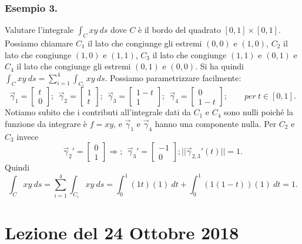 \documentclass[10pt]{article}
\theoremstyle{plain}
\theoremstyle{definition}
\begin{document}
\subsubsection{Esempio 3.}
Valutare l'integrale $\int_Cxy\ ds$ dove $C$ è il bordo del quadrato $[0,1]\times [0,1]$. Possiamo chiamare $C_1$ il lato che congiunge gli estremi $(0,0)$ e $(1,0)$, $C_2$ il lato che congiunge $(1,0)$ e $(1,1)$, $C_3$ il lato che congiunge $(1,1)$ e $(0,1)$ e $C_4$ il lato che congiunge gli estremi $(0,1)$ e $(0,0)$. Si ha quindi $\int_Cxy\ ds=\sum_{i=1}^4\int_{C_i}xy\ ds$.
Possiamo parametrizzare facilmente:
$$ \vec{\gamma}_1=\begin{bmatrix}t\\0 \end{bmatrix}; \ \
\vec{\gamma}_2=\begin{bmatrix}1\\t \end{bmatrix};\ \
\vec{\gamma}_3=\begin{bmatrix}1-t\\1 \end{bmatrix};\ \
\vec{\gamma}_4=\begin{bmatrix}0\\1-t \end{bmatrix};\qquad per\ t\in [0,1].
$$
Notiamo subito che i contributi all'integrale dati da $C_1$ e $C_4$ sono nulli poiché la funzione da integrare è $f=xy$, e $\vec{\gamma}_1$ e $\vec{\gamma}_4$ hanno una componente nulla.
Per $C_2$ e $C_3$ invece
$$\vec{\gamma}_2'=\begin{bmatrix}0\\1 \end{bmatrix} \Rightarrow ; \ \
\vec{\gamma}_3'=\begin{bmatrix}-1\\0 \end{bmatrix}; ||\vec{\gamma}_{2,3}'(t)|| = 1.
$$
Quindi
$$\int_Cxy\ ds=\sum_{i=1}^4\int_{C_i}xy\ ds= \int_0^1(1t)(1)\ dt + \int_0^1(1(1-t))(1)\ dt = 1.$$


\section{Lezione del 24 Ottobre 2018}
 
\end{document}
